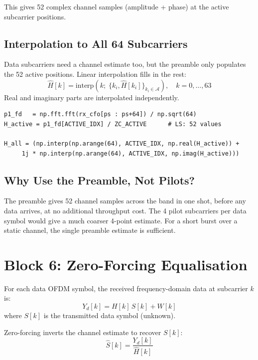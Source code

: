 \documentclass[11pt,a4paper]{article}
\begin{document}
This gives 52 complex channel samples (amplitude + phase) at the active
subcarrier positions.

\subsection{Interpolation to All 64 Subcarriers}

Data subcarriers need a channel estimate too, but the preamble only populates
the 52 active positions.  Linear interpolation fills in the rest:
\begin{equation}
  \hat{H}[k] = \text{interp}\!\left(k;\;
    \{k_i, \hat{H}[k_i]\}_{k_i \in \mathcal{A}}\right), \quad k = 0,\ldots,63
\end{equation}
Real and imaginary parts are interpolated independently.

\begin{lstlisting}
p1_fd   = np.fft.fft(rx_cfo[ps : ps+64]) / np.sqrt(64)
H_active = p1_fd[ACTIVE_IDX] / ZC_ACTIVE      # LS: 52 values

H_all = (np.interp(np.arange(64), ACTIVE_IDX, np.real(H_active)) +
     1j * np.interp(np.arange(64), ACTIVE_IDX, np.imag(H_active)))
\end{lstlisting}

\subsection{Why Use the Preamble, Not Pilots?}

The preamble gives 52 channel samples across the band in one shot, before any
data arrives, at no additional throughput cost.  The 4 pilot subcarriers per
data symbol would give a much coarser 4-point estimate.  For a short burst over
a static channel, the single preamble estimate is sufficient.

\section{Block 6: Zero-Forcing Equalisation}

For each data OFDM symbol, the received frequency-domain data at subcarrier $k$
is:
\begin{equation}
  Y_d[k] = H[k]\,S[k] + W[k]
\end{equation}
where $S[k]$ is the transmitted data symbol (unknown).

Zero-forcing inverts the channel estimate to recover $S[k]$:
\begin{equation}
  \hat{S}[k] = \frac{Y_d[k]}{\hat{H}[k]}
\end{equation}
\end{document}
